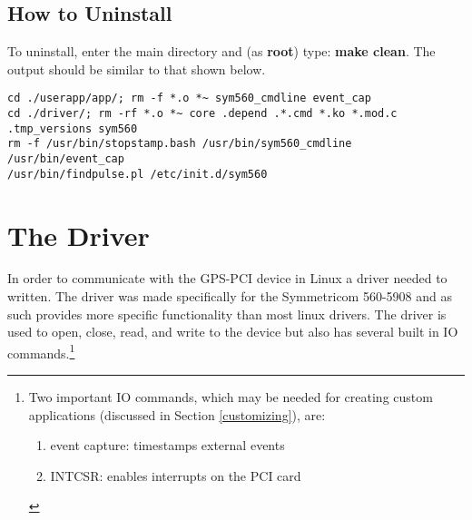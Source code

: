 \documentclass[11pt]{article}
\begin{document}
\subsection{How to Uninstall} \label{uninstall}
To uninstall, enter the main directory and (as \textbf{root}) type: \textbf{make clean}.  The output should be similar to that shown below.
\begin{footnotesize}
\begin{verbatim}
cd ./userapp/app/; rm -f *.o *~ sym560_cmdline event_cap
cd ./driver/; rm -rf *.o *~ core .depend .*.cmd *.ko *.mod.c .tmp_versions sym560
rm -f /usr/bin/stopstamp.bash /usr/bin/sym560_cmdline /usr/bin/event_cap 
/usr/bin/findpulse.pl /etc/init.d/sym560
\end{verbatim}
\end{footnotesize}



\section{The Driver} \label{driver}

In order to communicate with the GPS-PCI device in Linux a driver needed to written.  The driver was made specifically for the Symmetricom 560-5908 and as such provides more specific functionality than most linux drivers.  The driver is used to open, close, read, and write to the device but also has several built in IO commands.\footnote{Two important IO commands, which may be needed for creating custom applications (discussed in Section \ref{customizing}), are:
\begin{enumerate}
 \item event capture: timestamps external events
 \item INTCSR:  enables interrupts on the PCI card
\end{enumerate}
}
\end{document}
